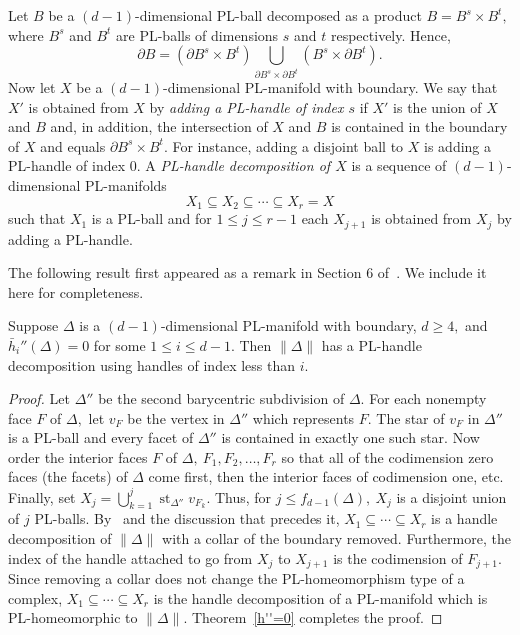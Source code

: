 \documentclass[ALCO,ThmDefs,Unicode,epreuves]{cedram}
\DeclareMathOperator\st{st}
\begin{document}
Let $B$ be a $(d-1)$-dimensional PL-ball decomposed as a product $B = B^s \times B^t,$ where $B^s$ and $B^t$ are PL-balls of dimensions $s$ and $t$ respectively. Hence, 
\[
\partial B = (\partial B^s \times B^t) \displaystyle\bigcup_{\partial B^s \times \partial B^t} (B^s \times \partial B^t).
\]
\noindent Now let $X$ be a $(d-1)$-dimensional PL-manifold with boundary. We say that $X'$ is obtained from $X$ by \emph{adding a PL-handle of index $s$} if 
$ X'$ is the union of $X$ and $B$ and, in addition, the intersection of $X$ and $B$ is contained in the boundary of $X$ and equals $\partial B^s \times B^t.$
 For instance, adding a disjoint ball to $X$ is adding a PL-handle of index $0.$ A \emph{PL-handle decomposition of $X$ } is a sequence of $(d-1)$-dimensional PL-manifolds
\[
X_1 \subseteq X_2 \subseteq \cdots \subseteq X_r = X
\]
such that $X_1$ is a PL-ball and for $1 \le j \le r-1$ each $X_{j+1}$ is obtained from $X_j$ by adding a PL-handle.

The following result first appeared as a remark in Section 6 of~\cite{Swartz-14}. We include it here for completeness.
\begin{theorem} \label{h''=0 -> handle decomposition}
Suppose $\Delta$ is a $(d-1)$-dimensional PL-manifold with boundary, $d \ge4,$ and $\bar{h}_i''(\Delta)=0$ for some $1 \le i \le d-1$. Then $\|\Delta\|$ has a PL-handle decomposition using handles of index less than $i$.
\end{theorem}

\begin{proof}
Let $\Delta''$ be the second barycentric subdivision of $\Delta.$ For each nonempty face $F$ of $\Delta,$ let $v_F$ be the vertex in $\Delta''$ which represents $F.$ The star of $v_F$ in $\Delta''$ is a PL-ball and every facet of $\Delta''$ is contained in exactly one such star. Now order the interior faces $F$ of $\Delta,~F_1, F_2, \dots, F_r$ so that all of the codimension zero faces (the facets) of $\Delta$ come first, then the interior faces of codimension one, etc. Finally, set $X_j = \bigcup ^j_{k=1} \st_{\Delta''} v_{F_k}.$ Thus, for $j \le f_{d-1}(\Delta), ~X_j$ is a disjoint union of $j$ PL-balls. By~\cite[Proposition~6.9]{Rourke-Sanderson} and the discussion that precedes it, $X_1 \subseteq \cdots \subseteq X_r$ is a handle decomposition of $\|\Delta\|$ with a collar of the boundary removed. Furthermore, the index of the handle attached to go from $X_j$ to $X_{j+1}$ is the codimension of $F_{j+1}.$ Since removing a collar does not change the PL-homeomorphism type of a complex, $X_1 \subseteq \cdots \subseteq X_r$ is the handle decomposition of a PL-manifold which is PL-homeomorphic to $\|\Delta\|.$ Theorem~\ref{h''=0} completes the proof. 
\end{proof}
\end{document}
